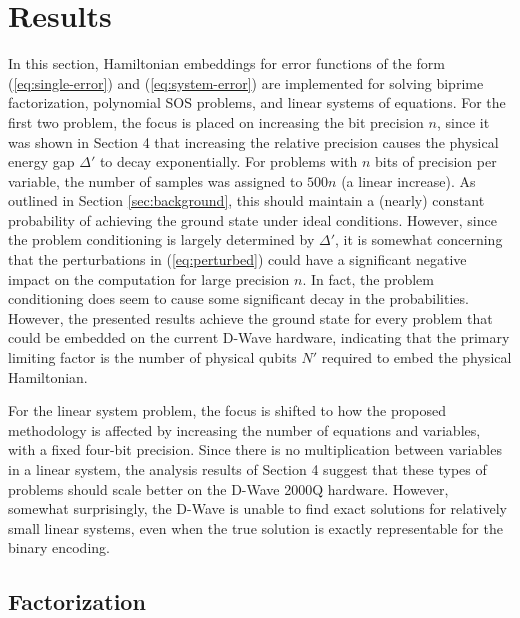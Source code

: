 \section{Results}

In this section, Hamiltonian embeddings for error functions of the form (\ref{eq:single-error}) and (\ref{eq:system-error}) are implemented for solving biprime factorization, polynomial SOS problems, and linear systems of equations.
For the first two problem, the focus is placed on increasing the bit precision $n$, since
it was shown in Section 4 that increasing the relative precision causes the physical energy gap $\Delta'$ to decay exponentially.
For problems with $n$ bits of precision per variable, the number of samples was assigned to $500n$ (a linear increase).
As outlined in Section \ref{sec:background}, this should maintain a (nearly) constant probability of achieving the ground state under ideal conditions.
However, since the problem conditioning is largely determined by $\Delta'$, it is somewhat concerning that the perturbations in (\ref{eq:perturbed}) could have a significant negative impact on the computation for large precision $n$.
In fact, the problem conditioning does seem to cause some significant decay in the probabilities.
However, the presented results achieve the ground state for every problem that could be embedded on the current D-Wave hardware, indicating that the primary limiting factor is the number of physical qubits $N'$ required to embed the physical Hamiltonian.

For the linear system problem, the focus is shifted to how the proposed methodology is affected by increasing the number of equations and variables, with a fixed four-bit precision.
Since there is no multiplication between variables in a linear system, the analysis results of Section 4 suggest that these types of problems should scale better on the D-Wave 2000Q hardware.
However, somewhat surprisingly, the D-Wave is unable to find exact solutions for relatively small linear systems, even when the true solution is exactly representable for the binary encoding.

\subsection{Factorization}
\label{sec:factorization}

